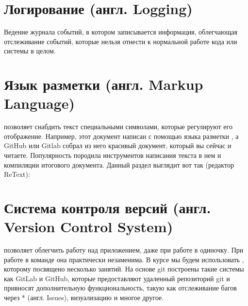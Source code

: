 \documentclass[letterpaper,10pt,russian]{sphinxmanual}
\begin{document}
\sphinxAtStartPar
{}


\section{Логирование (англ. Logging)}
\label{\detokenize{educational_materials/terms/content:logging}}
\sphinxAtStartPar
Ведение журнала событий, в котором записывается информация, облегчающая отслеживание событий, которые нельзя отнести к нормальной работе кода или системы в целом.


\section{Язык разметки (англ. Markup Language)}
\label{\detokenize{educational_materials/terms/content:markup-language}}
\sphinxAtStartPar
{} позволяет снабдить текст специальными символами, которые регулируют его отображение. Например, этот документ написан с помощью языка разметки , а GitHub или Gitlab собрал из него красивый документ, который вы сейчас и читаете. Популярность  породила  инструментов написания текста в нем и компиляции итогового документа. Данный раздел выглядит вот так (редактор ReText):

\sphinxAtStartPar
{}


\section{Система контроля версий (англ. Version Control System)}
\label{\detokenize{educational_materials/terms/content:version-control-system}}
\sphinxAtStartPar
{} позволяет облегчить работу над приложением, даже при работе в одиночку. При работе в команде она практически незаменима. В курсе мы будем использовать , которому посвящено несколько занятий. На основе git построены такие системы как GitLab и GitHub, которые предоставляют удаленный репозиторий git и привносят дополнительную функциональность, такую как отслеживание багов через * (англ. Issues), визуализацию и многое другое.
\end{document}
